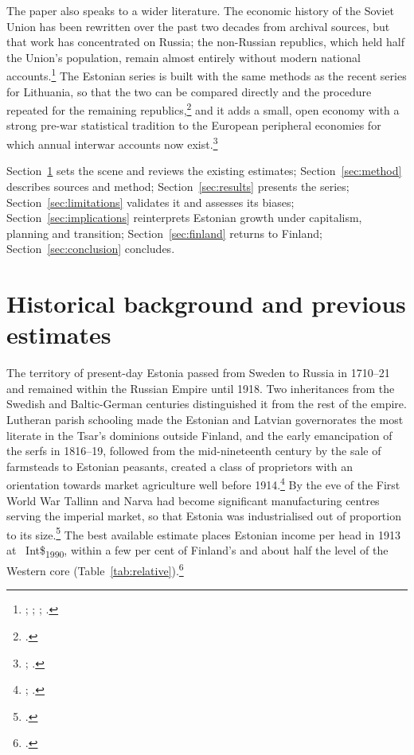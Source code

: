 \documentclass[12pt,a4paper]{article}
\newcommand{\intlnineteen}{Int\$\textsubscript{1990}}   %
\begin{document}
The paper also speaks to a wider literature. The economic history of the Soviet Union has been rewritten over the past two decades from archival sources, but that work has concentrated on Russia; the non-Russian republics, which held half the Union's population, remain almost entirely without modern national accounts.\footnote{\autocite{zhuravskaya2024}; \autocite[277--302]{vonyoinmorys2021}; \autocite{voskoboynikov2021}; \autocite{kalinovsky2022}.} The Estonian series is built with the same methods as the recent series for Lithuania, so that the two can be compared directly and the procedure repeated for the remaining republics,\footnote{\autocite{klimantas2026soviet}.} and it adds a small, open economy with a strong pre-war statistical tradition to the European peripheral economies for which annual interwar accounts now exist.\footnote{\autocite[877--80]{kenny_irelandgdp}; \autocite[162, 165--6]{morysinterwarinmorys2021}.}

Section~\ref{sec:background} sets the scene and reviews the existing estimates; Section~\ref{sec:method} describes sources and method; Section~\ref{sec:results} presents the series; Section~\ref{sec:limitations} validates it and assesses its biases; Section~\ref{sec:implications} reinterprets Estonian growth under capitalism, planning and transition; Section~\ref{sec:finland} returns to Finland; Section~\ref{sec:conclusion} concludes.

\section{Historical background and previous estimates}
\label{sec:background}

The territory of present-day Estonia passed from Sweden to Russia in 1710--21 and remained within the Russian Empire until 1918. Two inheritances from the Swedish and Baltic-German centuries distinguished it from the rest of the empire. Lutheran parish schooling made the Estonian and Latvian governorates the most literate in the Tsar's dominions outside Finland, and the early emancipation of the serfs in 1816--19, followed from the mid-nineteenth century by the sale of farmsteads to Estonian peasants, created a class of proprietors with an orientation towards market agriculture well before 1914.\footnote{\autocite[70--1, 85]{kasekamp2010}; \autocite[149--66]{eellend2010}.} By the eve of the First World War Tallinn and Narva had become significant manufacturing centres serving the imperial market, so that Estonia was industrialised out of proportion to its size.\footnote{\autocite[102]{ehbaltics_tarvel}.} The best available estimate places Estonian income per head in 1913 at ~\intlnineteen{}, within a few per cent of Finland's and about half the level of the Western core (Table~\ref{tab:relative}).\footnote{\autocite[603]{norkusmark2021}.}
\end{document}
